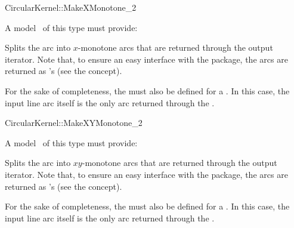 \begin{ccRefFunctionObjectConcept}{CircularKernel::MakeXMonotone_2}


A model \ccVar\ of this type must provide:

{Splits the arc  into $x$-monotone arcs that are returned through the 
output iterator. Note that, to ensure an easy interface with the 
 package, the arcs are returned as 's 
(see the  concept).}

For the sake of completeness, the  must also be
defined for a
. In this case, the input line arc itself is the only
arc returned through the . 

\ccSeeAlso


\end{ccRefFunctionObjectConcept}
\begin{ccRefFunctionObjectConcept}{CircularKernel::MakeXYMonotone_2}


A model \ccVar\ of this type must provide:

{Splits the arc  into $xy$-monotone arcs that are returned through the 
output iterator. Note that, to ensure an easy interface with the 
 package, the arcs are returned as 's 
(see the  concept).}

For the sake of completeness, the  must also be
defined for a
. In this case, the input line arc itself is the only
arc returned through the . 

\ccSeeAlso


\end{ccRefFunctionObjectConcept}
